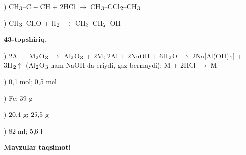 \documentclass[11pt,a4paper]{article}
\renewcommand{\textsubscript}[1]{\ensuremath{_{\text{\fontsize{8}{8}\selectfont #1}}}}
\begin{document}
) CH\textsubscript{3}--C$\equiv$CH + 2HCl $\to$ CH\textsubscript{3}--CCl\textsubscript{2}--CH\textsubscript{3}\par
{}) CH\textsubscript{3}--CHO + H\textsubscript{2} $\to$ CH\textsubscript{3}--CH\textsubscript{2}--OH\par
\noindent\textbf{43-topshiriq.}\par
{}) 2Al + M\textsubscript{2}O\textsubscript{3} $\to$ Al\textsubscript{2}O\textsubscript{3} + 2M; 2Al + 2NaOH + 6H\textsubscript{2}O $\to$ 2Na[Al(OH)\textsubscript{4}] + 3H\textsubscript{2}$\uparrow$ (Al\textsubscript{2}O\textsubscript{3} ham NaOH da eriydi, gaz bermaydi); M + 2HCl $\to$ M\par
{}) 0,1 mol; 0,5 mol\par
{}) Fe; 39 g\par
{}) 20,4 g; 25,5 g\par
{}) 82 ml; 5,6 l\par
\par\bigskip\noindent\textbf{Mavzular taqsimoti}\par\smallskip
\end{document}
